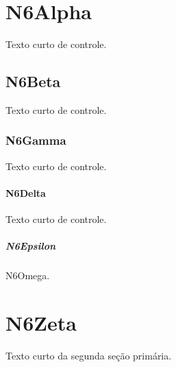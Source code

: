 \documentclass{abntexto-ufc}
\begin{document}
\textual

\section{N6Alpha}
Texto curto de controle.

\subsection{N6Beta}
Texto curto de controle.

\subsubsection{N6Gamma}
Texto curto de controle.

\paragraph{N6Delta}
Texto curto de controle.

\subparagraph{N6Epsilon}
N6Omega.

\section{N6Zeta}
Texto curto da segunda seção primária.
\end{document}
